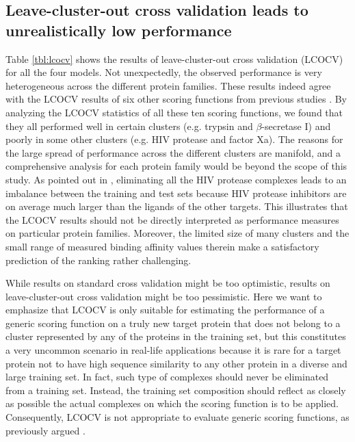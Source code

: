 \documentclass[twocolumn]{bmcart}
\begin{document}
\subsection*{Leave-cluster-out cross validation leads to unrealistically low performance}

Table \ref{tbl:lcocv} shows the results of leave-cluster-out cross validation (LCOCV) for all the four models. Not unexpectedly, the observed performance is very heterogeneous across the different protein families. These results indeed agree with the LCOCV results of six other scoring functions from previous studies \cite{774,1414,1194,1410,1347,1415}. By analyzing the LCOCV statistics of all these ten scoring functions, we found that they all performed well in certain clusters (e.g. trypsin and $\beta$-secretase I) and poorly in some other clusters (e.g. HIV protease and factor Xa). The reasons for the large spread of performance across the different clusters are manifold, and a comprehensive analysis for each protein family would be beyond the scope of this study. As pointed out in \cite{1347}, eliminating all the HIV protease complexes leads to an imbalance between the training and test sets because HIV protease inhibitors are on average much larger than the ligands of the other targets. This illustrates that the LCOCV results should not be directly interpreted as performance measures on particular protein families. Moreover, the limited size of many clusters and the small range of measured binding affinity values therein make a satisfactory prediction of the ranking rather challenging.

While results on standard cross validation might be too optimistic, results on leave-cluster-out cross validation might be too pessimistic. Here we want to emphasize that LCOCV is only suitable for estimating the performance of a generic scoring function on a truly new target protein that does not belong to a cluster represented by any of the proteins in the training set, but this constitutes a very uncommon scenario in real-life applications because it is rare for a target protein not to have high sequence similarity to any other protein in a diverse and large training set. In fact, such type of complexes should never be eliminated from a training set. Instead, the training set composition should reflect as closely as possible the actual complexes on which the scoring function is to be applied. Consequently, LCOCV is not appropriate to evaluate generic scoring functions, as previously argued \cite{908}.
\end{document}
